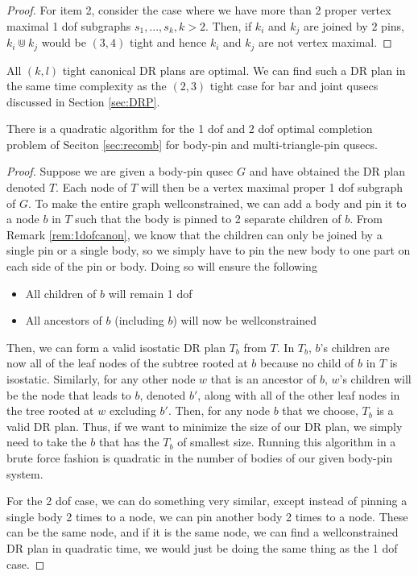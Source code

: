 \begin{proof}

    For item 2, consider the case where we have more than 2 proper vertex maximal 1 dof subgraphs $s_1, ..., s_k, k > 2$. Then, if $k_i$ and $k_j$ are joined by $2$ pins, $k_i \Cup k_j$ would be $(3,4)$ tight and hence $k_i$ and $k_j$ are not vertex maximal.
\end{proof}

\begin{remark}
    All $(k,l)$ tight canonical DR plans are optimal. We can find such a DR plan in the same time complexity as the $(2,3)$ tight case for bar and joint qusecs discussed in Section \ref{sec:DRP}.
\end{remark}

\begin{theorem}
    There is a quadratic algorithm for the 1 dof and 2 dof optimal completion problem of Seciton \ref{sec:recomb} for body-pin and multi-triangle-pin qusecs.
\end{theorem}

\begin{proof}
    Suppose we are given a body-pin qusec $G$ and have obtained the DR plan denoted $T$. Each node of $T$ will then be a vertex maximal proper 1 dof subgraph of $G$. To make the entire graph wellconstrained, we can add a body and pin it to a node $b$ in $T$ such that the body is pinned to 2 separate children of $b$. From Remark \ref{rem:1dofcanon}, we know that the children can only be joined by a single pin or a single body, so we simply have to pin the new body to one part on each side of the pin or body. Doing so will ensure the following

    \begin{itemize}
        \item All children of $b$ will remain 1 dof
        \item All ancestors of $b$ (including $b$) will now be wellconstrained
    \end{itemize}

    Then, we can form a valid isostatic DR plan $T_b$ from $T$. In $T_b$, $b$'s children are now all of the leaf nodes of the subtree rooted at $b$ because no child of $b$ in $T$ is isostatic. Similarly, for any other node $w$ that is an ancestor of $b$, $w$'s children will be the node that leads to $b$, denoted $b'$, along with all of the other leaf nodes in the tree rooted at $w$ excluding $b'$. Then, for any node $b$ that we choose, $T_b$ is a valid DR plan. Thus, if we want to minimize the size of our DR plan, we simply need to take the $b$ that has the $T_b$ of smallest size. Running this algorithm in a brute force fashion is quadratic in the number of bodies of our given body-pin system.

    For the 2 dof case, we can do something very similar, except instead of pinning a single body 2 times to a node, we can pin another body 2 times to a node. These can be the same node, and if it is the same node, we can find a wellconstrained DR plan in quadratic time, we would just be doing the same thing as the 1 dof case.
\end{proof}
